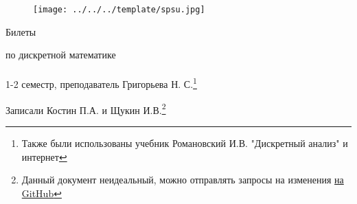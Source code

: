 \documentclass[main]{subfiles}
\begin{document}
	\begin{figure}[H]
			\texttt{[image: ../../../template/spsu.jpg]}
			\centering
	\end{figure}
	\vspace*{\fill}
	\begin{center}
		\huge Билеты

		\huge по дискретной математике\\ \ \\
		\Large 1-2 семестр, преподаватель Григорьева Н. С.\footnote{Также были использованы учебник Романовский И.В. "Дискретный анализ"{} и интернет}

		\large Записали Костин П.А. и Щукин И.В.\footnote{Данный документ неидеальный, можно отправлять запросы на изменения \href{https://github.com/KostinP/Mathematical-LecturesAndPractices}{на GitHub}}
	\end{center}
	\vspace*{\fill}
	\vspace*{\fill}

	\newpage
	\tableofcontents
	\newpage
\end{document}
